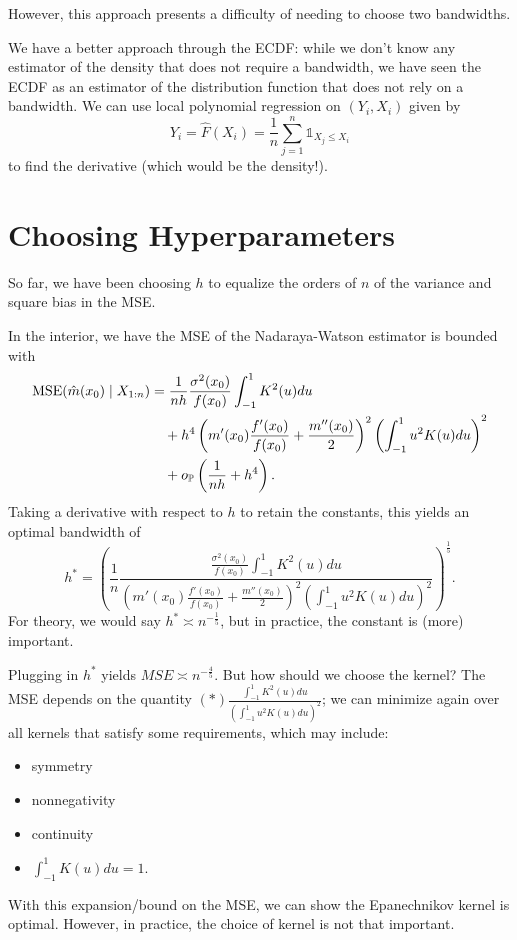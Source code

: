 However, this approach presents a difficulty of needing to choose two bandwidths. 

We have a better approach through the ECDF: while we don't know any estimator of the density that does not require a bandwidth, we have seen the ECDF as an estimator of the distribution function that does not rely on a bandwidth. We can use local polynomial regression on $(Y_i, X_i)$ given by \[
	Y_i = \hat{F}(X_i) = \frac{1}{n} \sum\limits_{j=1}^{n} \mathds{1}_{X_j \le X_i}
\] to find the derivative (which would be the density!).

\section{Choosing Hyperparameters}



So far, we have been choosing $h$ to equalize the orders of $n$ of the variance and square bias in the MSE.

In the interior, we have the MSE of the Nadaraya-Watson estimator is bounded with
\begin{align*}
	\operatorname{MSE}(\hat{m}(x_0) \mid X_{1:n})
	&= \frac{1}{nh} \frac{\sigma^2(x_0)}{f(x_0)} \int_{-1}^{1} K^2(u)du \\
	&\quad + h^4 \left( m'(x_0) \frac{f'(x_0)}{f(x_0)} + \frac{m''(x_0)}{2}  \right)^2 \left( \int_{-1}^{1} u^2 K(u)du \right)^2 \\
	&\quad + o_{\mathbb{P}}\left( \frac{1}{nh} + h^4 \right)
.\end{align*}
Taking a derivative with respect to $h$ to retain the constants, this yields an optimal bandwidth of \[
	h^* = \left( \frac{1}{n}
		\frac{\frac{\sigma^2(x_0)}{f(x_0)} \int_{-1}^{1} K^2(u)du}
		{\left( m'(x_0) \frac{f'(x_0)}{f(x_0)} + \frac{m''(x_0)}{2} \right)^2 \left( \int_{-1}^{1} u^2K(u)du  \right)^2}
	\right)^{\frac{1}{5}}			
.\] For theory, we would say $h^* \asymp n^{-\frac{1}{5}}$, but in practice, the constant is (more) important.

\medskip

Plugging in $h^*$ yields $MSE \asymp n^{-\frac{4}{5}}$. But how should we choose the kernel? The MSE depends on the quantity $(*) \frac{\int_{-1}^{1}K^2(u)du  }{\left( \int_{-1}^{1} u^2K(u)du  \right)^2}$; we can minimize again over all kernels that satisfy some requirements, which may include:
\begin{itemize}
	\item symmetry
	\item nonnegativity
	\item continuity
	\item $\int_{-1}^{1} K(u)du = 1$.
\end{itemize}
With this expansion/bound on the MSE, we can show the Epanechnikov kernel is optimal. However, in practice, the choice of kernel is not that important.


